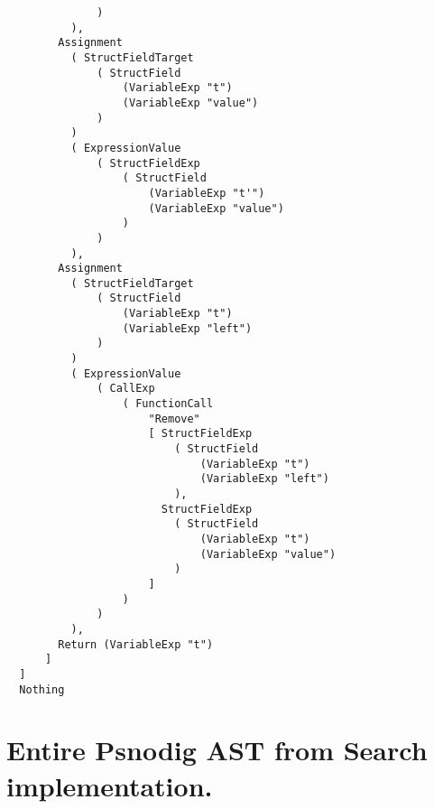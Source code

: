 \begin{lstlisting}
              )
          ),
        Assignment
          ( StructFieldTarget
              ( StructField
                  (VariableExp "t")
                  (VariableExp "value")
              )
          )
          ( ExpressionValue
              ( StructFieldExp
                  ( StructField
                      (VariableExp "t'")
                      (VariableExp "value")
                  )
              )
          ),
        Assignment
          ( StructFieldTarget
              ( StructField
                  (VariableExp "t")
                  (VariableExp "left")
              )
          )
          ( ExpressionValue
              ( CallExp
                  ( FunctionCall
                      "Remove"
                      [ StructFieldExp
                          ( StructField
                              (VariableExp "t")
                              (VariableExp "left")
                          ),
                        StructFieldExp
                          ( StructField
                              (VariableExp "t")
                              (VariableExp "value")
                          )
                      ]
                  )
              )
          ),
        Return (VariableExp "t")
      ]
  ]
  Nothing
\end{lstlisting}

\section{Entire Psnodig AST from Search implementation.}
\label{appendix:Entire Psnodig AST from Search implementation.}

